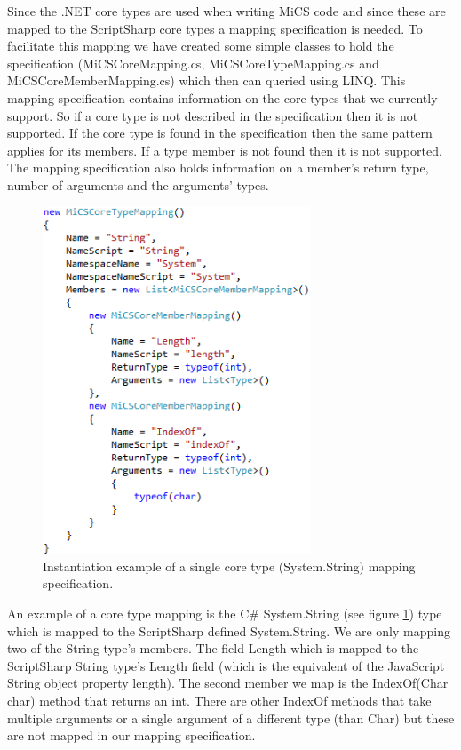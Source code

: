 			Since the .NET core types are used when writing MiCS code and since these are mapped to the ScriptSharp core types a mapping specification is needed. To facilitate this mapping we have created some simple classes to hold the specification (MiCSCoreMapping.cs, MiCSCoreTypeMapping.cs and MiCSCoreMemberMapping.cs) which then can queried using LINQ. This mapping specification contains information on the core types that we currently support. So if a core type is not described in the specification then it is not supported. If the core type is found in the specification then the same pattern applies for its members. If a type member is not found then it is not supported. The mapping specification also holds information on a member’s return type, number of arguments and the arguments’ types.

			\begin{figure}[H]
					\includegraphics[width=8cm]{resources/images/InitiationOfTypeMapping.png}
				\caption{Instantiation example of a single core type (System.String) mapping specification.}
				\label{coreTypeMapping}
			\end{figure}

			An example of a core type mapping is the C\# System.String (see figure \ref{coreTypeMapping}) type which is mapped to the ScriptSharp defined System.String. We are only mapping two of the String type’s members. The field Length which is mapped to the ScriptSharp String type’s Length field (which is the equivalent of the JavaScript String object property length). The second member we map is the IndexOf(Char char) method that returns an int. There are other IndexOf methods that take multiple arguments or a single argument of a different type (than Char) but these are not mapped in our mapping specification.


